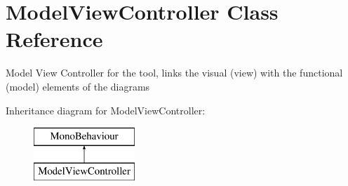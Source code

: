 \hypertarget{class_model_view_controller}{}\section{Model\+View\+Controller Class Reference}
\label{class_model_view_controller}


Model View Controller for the tool, links the visual (view) with the functional (model) elements of the diagrams  


Inheritance diagram for Model\+View\+Controller\+:\begin{figure}[H]
\begin{center}
\leavevmode
\includegraphics[height=2.000000cm]{class_model_view_controller}
\end{center}
\end{figure}
